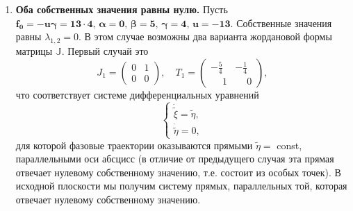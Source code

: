 \documentclass[12pt, a4paper]{article}
\begin{document}
\begin{enumerate}
\begin{enumerate}
	На рис.~\ref{newfazov} прямые параллельны оси абсцисс, т.е. прямой, отвечающей ненулевому собственному значению $\lambda_1$. Система параллельных прямых при линейном преобразовании плоскости переходит в систему параллельных прямых, поэтому и в исходной плоскости на рис.~\ref{oldfazov} мы получим систему прямых, параллельных той, которая отвечает ненулевому собственному значению. Отметим, что эта система прямых пересекает еще одну прямую отвечающую нулевому собственному значению $\lambda_2$ и состоящую целиком из особых точек.
	\begin{figure}[H]
		\centering
		\begin{subfigure}[H]{0.4\textwidth}
			\texttt{[image: j2\\\_1]}
			\caption{Фазовый портрет в $(\xi,\eta)$}
			\label{oldfazov}
		\end{subfigure}
		\qquad\qquad
		\begin{subfigure}[H]{0.4\textwidth}
			\texttt{[image: j2\\\_2]}
			\caption{Фазовый портрет в $(\tilde\xi,\tilde\eta)$}
			\label{newfazov}
		\end{subfigure}	
		\\[0.2cm]
		\caption{Фазовые портреты при $\alpha=0$}
	\end{figure}
	\item \textbf{Оба собственных значения равны нулю.} Пусть $\boldsymbol{f_0=-u\gamma=13\cdot 4,\,\alpha=0,\,\beta=5,\,\gamma=4,\,u=-13}$. Собственные значения равны $\lambda_{1,2}=0$.
	В этом случае возможны два варианта жордановой формы матрицы $\mathbb{J}$.
	Первый случай это
	\[
	J_1=\begin{pmatrix}
		0 & 1 \\
		0 & 0
	\end{pmatrix},
	\quad
	T_1=\begin{pmatrix}
		-\frac{5}{4} & -\frac{1}{4} \\
		\phantom{-}1 & \phantom{-}0
	\end{pmatrix},
	\]
	что соответствует системе дифференциальных уравнений
	\[
	\begin{cases}
		\dot{\tilde{\xi}}=\tilde{\eta},\\
		\dot{\tilde{\eta}}=0,
	\end{cases}
	\]
	для которой фазовые траектории оказываются прямыми $\tilde\eta =$ const, параллельными оси абсцисс (в отличие от предыдущего случая эта прямая отвечает нулевому собственному значению, т.е. состоит из особых точек). В исходной плоскости мы получим систему прямых, параллельных той, которая отвечает нулевому собственному значению.

\end{enumerate}
\end{enumerate}
\end{document}
